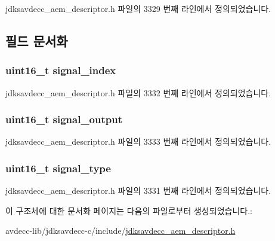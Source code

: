 jdksavdecc\+\_\+aem\+\_\+descriptor.\+h 파일의 3329 번째 라인에서 정의되었습니다.



\subsection{필드 문서화}
\subsubsection[{\texorpdfstring{signal\+\_\+index}{signal_index}}]{\setlength{\rightskip}{0pt plus 5cm}uint16\+\_\+t signal\+\_\+index}\hypertarget{structjdksavdecc__multiplexer__source_ae2e81a95ee9ad83f1fe22b6a1ee29075}{}\label{structjdksavdecc__multiplexer__source_ae2e81a95ee9ad83f1fe22b6a1ee29075}


jdksavdecc\+\_\+aem\+\_\+descriptor.\+h 파일의 3332 번째 라인에서 정의되었습니다.

\subsubsection[{\texorpdfstring{signal\+\_\+output}{signal_output}}]{\setlength{\rightskip}{0pt plus 5cm}uint16\+\_\+t signal\+\_\+output}\hypertarget{structjdksavdecc__multiplexer__source_ab4b91864e6fc335d7e86536d9f4461e4}{}\label{structjdksavdecc__multiplexer__source_ab4b91864e6fc335d7e86536d9f4461e4}


jdksavdecc\+\_\+aem\+\_\+descriptor.\+h 파일의 3333 번째 라인에서 정의되었습니다.

\subsubsection[{\texorpdfstring{signal\+\_\+type}{signal_type}}]{\setlength{\rightskip}{0pt plus 5cm}uint16\+\_\+t signal\+\_\+type}\hypertarget{structjdksavdecc__multiplexer__source_a248e60ef99d5ed1779989d1dd6b6dc5a}{}\label{structjdksavdecc__multiplexer__source_a248e60ef99d5ed1779989d1dd6b6dc5a}


jdksavdecc\+\_\+aem\+\_\+descriptor.\+h 파일의 3331 번째 라인에서 정의되었습니다.



이 구조체에 대한 문서화 페이지는 다음의 파일로부터 생성되었습니다.\+:\begin{DoxyCompactItemize}
\item 
avdecc-\/lib/jdksavdecc-\/c/include/\hyperlink{jdksavdecc__aem__descriptor_8h}{jdksavdecc\+\_\+aem\+\_\+descriptor.\+h}\end{DoxyCompactItemize}
